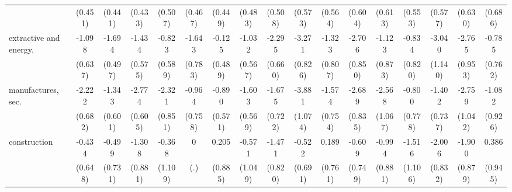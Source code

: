 {\begin{tabular}{l*{16}{c}}
                    &     (0.451)         &     (0.441)         &     (0.433)         &     (0.507)         &     (0.467)         &     (0.449)         &     (0.483)         &     (0.508)         &     (0.573)         &     (0.564)         &     (0.604)         &     (0.613)         &     (0.553)         &     (0.577)         &     (0.630)         &     (0.686)         \\
[1em]
extractive and energy.&      -1.098         &      -1.694\sym{***}&      -1.434\sym{*}  &      -0.823         &      -1.643\sym{*}  &      -0.125         &      -1.032         &      -2.295\sym{***}&      -3.271\sym{***}&      -1.323         &      -2.706\sym{**} &      -1.123         &      -0.834         &      -3.040\sym{**} &      -2.765\sym{**} &      -0.785         \\
                    &     (0.637)         &     (0.497)         &     (0.575)         &     (0.589)         &     (0.783)         &     (0.489)         &     (0.567)         &     (0.660)         &     (0.826)         &     (0.807)         &     (0.850)         &     (0.873)         &     (0.820)         &     (1.140)         &     (0.953)         &     (0.762)         \\
[1em]
manufactures, sec.  &      -2.222\sym{**} &      -1.343\sym{*}  &      -2.774\sym{***}&      -2.321\sym{**} &      -0.964         &      -0.890         &      -1.603\sym{**} &      -1.675\sym{*}  &      -3.881\sym{***}&      -1.574\sym{*}  &      -2.689\sym{**} &      -2.568\sym{*}  &      -0.800         &      -1.402         &      -2.759\sym{**} &      -1.082         \\
                    &     (0.682)         &     (0.601)         &     (0.605)         &     (0.851)         &     (0.758)         &     (0.571)         &     (0.569)         &     (0.722)         &     (1.074)         &     (0.754)         &     (0.835)         &     (1.067)         &     (0.778)         &     (0.737)         &     (1.042)         &     (0.926)         \\
[1em]
construction        &      -0.434         &      -0.499         &      -1.308         &      -0.368         &           0         &       0.205         &      -0.571         &      -1.471         &      -0.522         &       0.189         &      -0.609         &      -0.994         &      -1.516         &      -2.006\sym{*}  &      -1.900\sym{*}  &       0.386         \\
                    &     (0.648)         &     (0.731)         &     (0.881)         &     (1.109)         &         (.)         &     (0.885)         &     (1.049)         &     (0.820)         &     (0.691)         &     (0.761)         &     (0.749)         &     (0.881)         &     (1.106)         &     (0.832)         &     (0.879)         &     (0.945)         \\

\end{tabular}}
